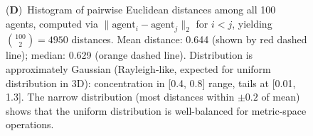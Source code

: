 \begin{figure}[!htbp]
{    (\textbf{D})~Histogram of pairwise Euclidean distances among all 100 agents, computed via $\| \text{agent}_i - \text{agent}_j \|_2$ for $i < j$, yielding $\binom{100}{2} = 4950$ distances. Mean distance: 0.644 (shown by red dashed line); median: 0.629 (orange dashed line). Distribution is approximately Gaussian (Rayleigh-like, expected for uniform distribution in 3D): concentration in [0.4, 0.8] range, tails at [0.01, 1.3]. The narrow distribution (most distances within $\pm 0.2$ of mean) shows that the uniform distribution is well-balanced for metric-space operations.}
    \label{fig:panel2_dual_domain}
\end{figure}


